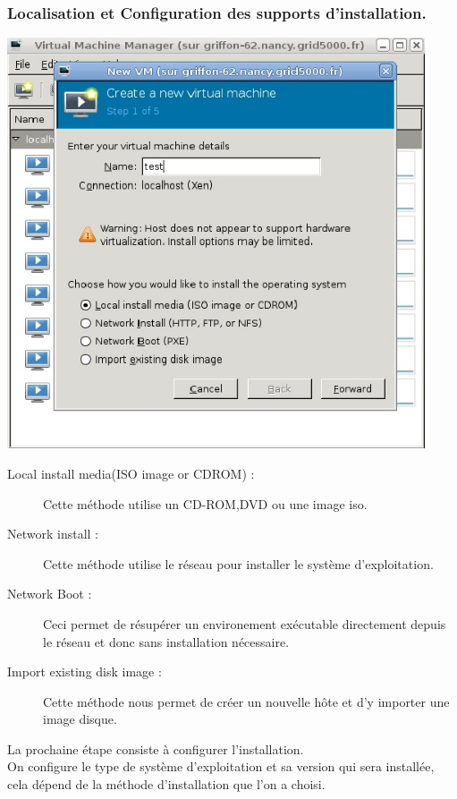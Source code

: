 \subsubsection{Localisation et Configuration des supports d'installation.}
\begin{center}
\includegraphics[width=350pt]{images/nommachine.jpg}
\end{center}
\begin{description}
  \item[Local install media(ISO image or CDROM) :] Cette méthode utilise un CD-ROM,DVD ou une image iso.
  \item[Network install :] Cette méthode utilise le réseau pour installer le système d'exploitation.
  \item[Network Boot :] Ceci permet de résupérer un environement exécutable directement depuis le réseau et donc sans installation nécessaire.
  \item[Import existing disk image :] Cette méthode nous permet de créer un nouvelle hôte et d'y importer une image disque.
\end{description}
La prochaine étape consiste à configurer l'installation.\\
On configure le type de système d'exploitation et sa version qui sera installée, cela dépend de la méthode d'installation que l'on a choisi.
